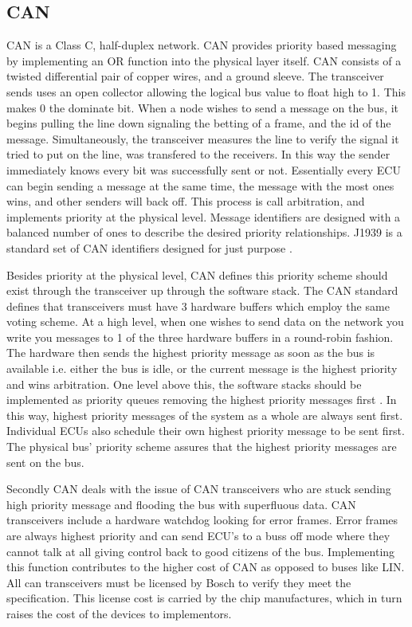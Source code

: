 \documentclass[conference,12pt]{IEEEtran}
\begin{document}
\subsection{CAN} 
CAN is a Class C, half-duplex network. CAN provides priority based messaging by
implementing an OR function into the physical layer itself. CAN consists of
a twisted differential pair of copper wires, and a ground sleeve.  The
transceiver sends uses an open collector allowing the logical bus value to float
high to 1. This makes 0 the dominate bit.  When a node wishes to send a message
on the bus, it begins pulling the line down signaling the betting of a frame,
and the id of the message. Simultaneously, the transceiver measures the line to
verify the signal it tried to put on the line, was transfered to the receivers.
In this way the sender immediately knows every bit was successfully sent or not.
Essentially every ECU can begin sending a message at the same time, the message
with the most ones wins, and other senders will back off. This process is call
arbitration, and implements priority at the physical level. Message identifiers
are designed with a balanced number of ones to describe the desired priority
relationships. J1939 is a standard set of CAN identifiers designed for just
purpose \autocite{sae_j1939}.

Besides priority at the physical level, CAN defines this priority scheme should
exist through the transceiver up through the software stack.  The CAN standard
defines that transceivers must have 3 hardware buffers which employ the same
voting scheme. At a high level, when one wishes to send data on the network you
write you messages to 1 of the three hardware buffers in a round-robin fashion.
The hardware then sends the highest priority message as soon as the bus is
available i.e. either the bus is idle, or the current message is the highest
priority and wins arbitration. One level above this, the software stacks should
be implemented as priority queues removing the highest priority messages first
\autocite{std_can}.  In this way, highest priority messages of the system as
a whole are always sent first.  Individual ECUs also schedule their own highest
priority message to be sent first. The physical bus' priority scheme assures that
the highest priority messages are sent on the bus.  

Secondly CAN deals with the issue of CAN transceivers who are stuck sending high
priority message and flooding the bus with superfluous data. CAN transceivers
include a hardware watchdog looking for error frames. Error frames are always
highest priority and can send ECU's to a buss off mode where they cannot talk at
all giving control back to good citizens of the bus. Implementing this function
contributes to the higher cost of CAN as opposed to buses like LIN. All can
transceivers must be licensed by Bosch to verify they meet the specification.
This license cost is carried by the chip manufactures, which in turn raises the
cost of the devices to implementors. 
\end{document}
